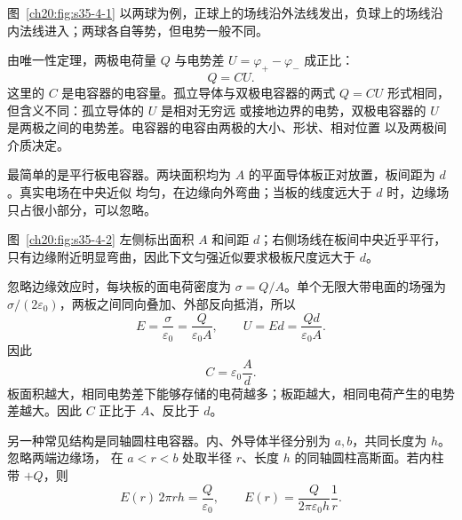 {图~\ref{ch20:fig:s35-4-1} 以两球为例，正球上的场线沿外法线发出，负球上的场线沿内法线进入；两球各自等势，但电势一般不同。

\par\noindent\begin{minipage}{\linewidth}
\capacitorFieldFigure
{}\label{ch20:fig:s35-4-1}
\end{minipage}\par\medskip

由唯一性定理，两极电荷量 $Q$ 与电势差 $U=\varphi_+-\varphi_-$ 成正比：
\begin{equation}
  \boxed{Q=CU}.
\end{equation}
这里的 $C$ 是电容器的电容量。孤立导体与双极电容器的两式 $Q=CU$ 形式相同，但含义不同：孤立导体的 $U$ 是相对无穷远
或接地边界的电势，双极电容器的 $U$ 是两极之间的电势差。电容器的电容由两极的大小、形状、相对位置
以及两极间介质决定。

最简单的是平行板电容器。两块面积均为 $A$ 的平面导体板正对放置，板间距为 $d$。真实电场在中央近似
均匀，在边缘向外弯曲；当板的线度远大于 $d$ 时，边缘场只占很小部分，可以忽略。

图~\ref{ch20:fig:s35-4-2} 左侧标出面积 $A$ 和间距 $d$；右侧场线在板间中央近乎平行，只有边缘附近明显弯曲，因此下文匀强近似要求极板尺度远大于 $d$。

\par\noindent\begin{minipage}{\linewidth}
\parallelPlateFigure
{}\label{ch20:fig:s35-4-2}
\end{minipage}\par\medskip

忽略边缘效应时，每块板的面电荷密度为 $\sigma=Q/A$。单个无限大带电面的场强为
$\sigma/(2\varepsilon_0)$，两板之间同向叠加、外部反向抵消，所以
\[
  E=\frac{\sigma}{\varepsilon_0}=\frac{Q}{\varepsilon_0A},\qquad
  U=Ed=\frac{Qd}{\varepsilon_0A}.
\]
因此
\begin{equation}
  \boxed{C=\varepsilon_0\frac Ad}.
\end{equation}
板面积越大，相同电势差下能够存储的电荷越多；板距越大，相同电荷产生的电势差越大。因此 $C$ 正比于
$A$、反比于 $d$。

另一种常见结构是同轴圆柱电容器。内、外导体半径分别为 $a,b$，共同长度为 $h$。忽略两端边缘场，
在 $a<r<b$ 处取半径 $r$、长度 $h$ 的同轴圆柱高斯面。若内柱带 $+Q$，则
\[
  E(r)\,2\pi rh=\frac{Q}{\varepsilon_0},\qquad
  E(r)=\frac{Q}{2\pi\varepsilon_0h}\frac1r.
\]

}
